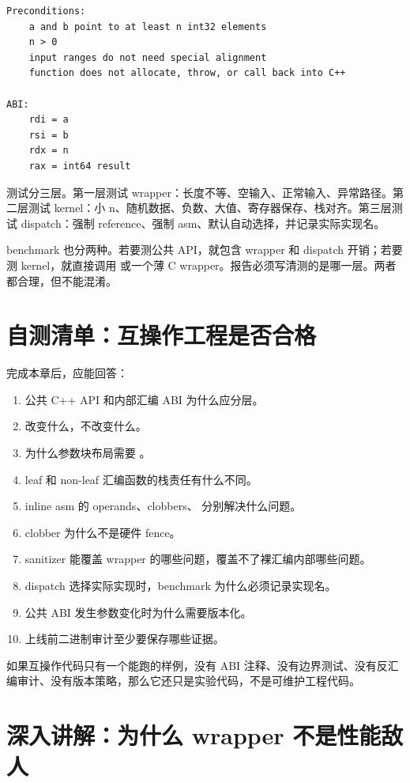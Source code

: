\begin{lstlisting}
Preconditions:
    a and b point to at least n int32 elements
    n > 0
    input ranges do not need special alignment
    function does not allocate, throw, or call back into C++

ABI:
    rdi = a
    rsi = b
    rdx = n
    rax = int64 result
\end{lstlisting}

测试分三层。第一层测试 wrapper：长度不等、空输入、正常输入、异常路径。第二层测试 kernel：小 n、随机数据、负数、大值、寄存器保存、栈对齐。第三层测试 dispatch：强制 reference、强制 asm、默认自动选择，并记录实际实现名。

benchmark 也分两种。若要测公共 API，就包含 wrapper 和 dispatch 开销；若要测 kernel，就直接调用  或一个薄 C wrapper。报告必须写清测的是哪一层。两者都合理，但不能混淆。

\section{自测清单：互操作工程是否合格}

完成本章后，应能回答：

\begin{enumerate}
  \item 公共 C++ API 和内部汇编 ABI 为什么应分层。
  \item {} 改变什么，不改变什么。
  \item 为什么参数块布局需要 。
  \item leaf 和 non-leaf 汇编函数的栈责任有什么不同。
  \item inline asm 的 operands、clobbers、 分别解决什么问题。
  \item {} clobber 为什么不是硬件 fence。
  \item sanitizer 能覆盖 wrapper 的哪些问题，覆盖不了裸汇编内部哪些问题。
  \item dispatch 选择实际实现时，benchmark 为什么必须记录实现名。
  \item 公共 ABI 发生参数变化时为什么需要版本化。
  \item 上线前二进制审计至少要保存哪些证据。
\end{enumerate}

如果互操作代码只有一个能跑的样例，没有 ABI 注释、没有边界测试、没有反汇编审计、没有版本策略，那么它还只是实验代码，不是可维护工程代码。

\section{深入讲解：为什么 wrapper 不是性能敌人}

